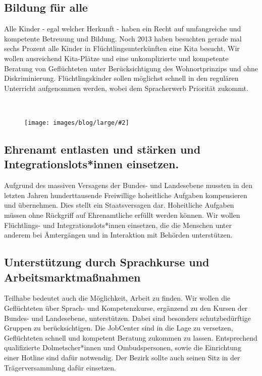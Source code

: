 \documentclass[a4paper,10pt]{article}
\newcommand{\mysection}[1]{{\vspace{1cm}\noindent\color{gray}{\ttfamily\LARGE\raggedright #1}\\\medskip}}
\newcommand{\abschnitt}[2]{%
\mysection{\raggedright #1}%
\begin{figure}[t]%
\vspace*{-2.7cm}%
\hspace*{-2.1cm}%
\texttt{[image: images/blog/large/\#2]} %
\end{figure}%
}
\begin{document}
\subsection*{\ttfamily Bildung für alle}\label{bildung-fuxfcr-alle}

Alle Kinder - egal welcher Herkunft - haben ein Recht auf umfangreiche
und kompetente Betreuung und Bildung. Noch 2013 haben besuchten gerade
mal sechs Prozent alle Kinder in Flüchtlingsunterkünften eine Kita
besucht. Wir wollen ausreichend Kita-Plätze und eine unkomplizierte und
kompetente Beratung von Geflüchteten unter Berücksichtigung des
Wohnortprinzips und ohne Diskriminierung. Flüchtlingskinder sollen
möglichst schnell in den regulären Unterricht aufgenommen werden, wobei
dem Spracherwerb Priorität zukommt.

\clearpage
\abschnitt{}{offyoucanfuck.jpg}
\subsection*{\ttfamily Ehrenamt entlasten und stärken und Integrationslots*innen
einsetzen.}\label{ehrenamt-entlasten-und-stuxe4rken-und-integrationslotsinnen-einsetzen.}

Aufgrund des massiven Versagens der Bundes- und Landesebene mussten in
den letzten Jahren hunderttausende Freiwillige hoheitliche Aufgaben
kompensieren und übernehmen. Dies stellt ein Staatsversagen dar.
Hoheitliche Aufgaben müssen ohne Rückgriff auf Ehrenamtliche erfüllt
werden können. Wir wollen Flüchtlings- und Integrationslots*innen
einsetzen, die die Menschen unter anderem bei Ämtergängen und in
Interaktion mit Behörden unterstützen.

\subsection*{\ttfamily Unterstützung durch Sprachkurse und
Arbeitsmarktmaßnahmen}\label{unterstuxfctzung-durch-sprachkurse-und-arbeitsmarktmauxdfnahmen}

Teilhabe bedeutet auch die Möglichkeit, Arbeit zu finden. Wir wollen die
Geflüchteten über Sprach- und Kompetenzkurse, ergänzend zu den Kursen
der Bundes- und Landesebene, unterstützen. Dabei sind besonders
schutzbedürftige Gruppen zu berücksichtigen. Die JobCenter sind in die
Lage zu versetzen, Geflüchteten schnell und kompetent Beratung zukommen
zu lassen. Entsprechend qualifizierte Dolmetscher*innen und
Ombudspersonen, sowie die Einrichtung einer Hotline sind dafür
notwendig. Der Bezirk sollte auch seinen Sitz in der Trägerversammlung
dafür einsetzen.
\end{document}
